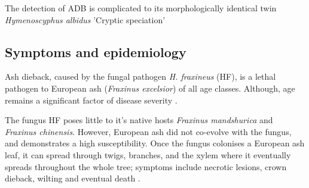 The detection of ADB is complicated to its morphologically identical twin \textit{Hymenoscyphus albidus} \cite{queloz2011cryptic} 'Cryptic speciation'

\subsection{Symptoms and epidemiology}

Ash dieback, caused by the fungal pathogen \textit{H. fraxineus} (HF), is a lethal pathogen to European ash (\textit{Fraxinus excelsior}) of all age classes. 
Although, age remains a significant factor of disease severity \cite{marccais2017estimation}.
 
The fungus HF poses little to it's native hosts \textit{Fraxinus mandshurica} and \textit{Fraxinus chinensis}.
However, European ash did not co-evolve with the fungus, and demonstrates a high susceptibility.
Once the fungus colonises a European ash leaf, it can spread through twigs, branches, and the xylem where it eventually spreads throughout the whole tree;
symptoms include necrotic lesions, crown dieback, wilting and eventual death \cite{gross2014h}.


